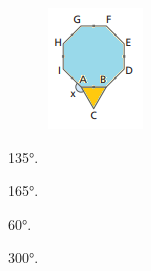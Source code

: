 \begin{figure}[H]
\centering\includegraphics[width=.5\textwidth]{./imgSAEB_8_MAT/media/image56.png}
\end{figure}


\begin{escolha}
\item 135°.
\item 165°.
\item 60°.
\item 300°.
\end{escolha}








